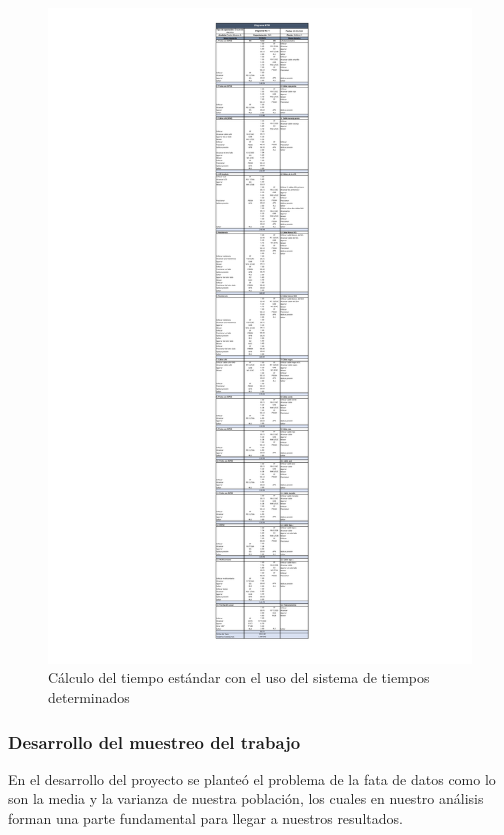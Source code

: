     \begin{figure}[H]
        \centering
        \includegraphics[trim = {100mm 1mm 100mm 10mm},clip,scale=0.41]{22/Img/diagramaMTM.pdf}
        \caption{Cálculo del tiempo estándar con el uso del sistema de tiempos determinados}
        \label{fig:STP}
    \end{figure}
    
    
    
    
    
    \subsubsection{Desarrollo del muestreo del trabajo}
    En el desarrollo del proyecto se planteó el problema de la fata de datos como lo son la media y la varianza de nuestra población, los cuales en nuestro análisis forman una parte fundamental para llegar a nuestros resultados. 
    
